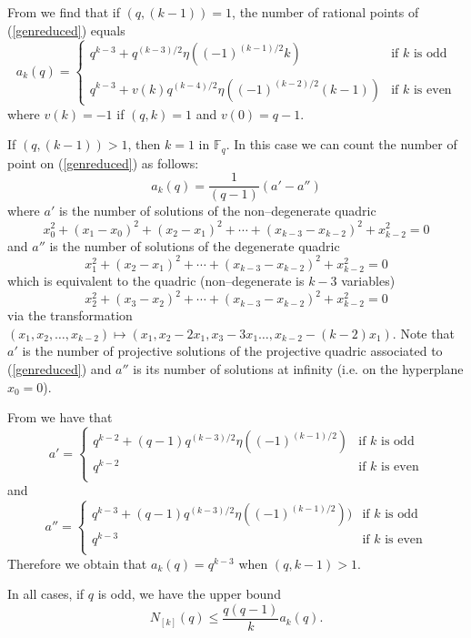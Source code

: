 \documentclass[10pt,a4paper,twoside]{article}
\def\Fq{{\mathbb{F}}_q}
\begin{document}
From
\cite[Theorem 6.26 -- 6.27]{LN}
we find that if $(q,(k-1))=1$, the number of rational points of
(\ref{genreduced}) equals
\begin{equation}\label{akappa}
a_k(q)=
\left\{
\begin{array}{ll}
q^{k-3}+q^{(k-3)/2}\eta((-1)^{(k-1)/2}k) & \textrm{if $k$ is odd}\\
&\\
q^{k-3} +v(k)q^{(k-4)/2}\eta((-1)^{(k-2)/2}(k-1)) & \textrm{if $k$ is even}
\end{array}
\right.
\end{equation}
where $v(k)=-1$ if $(q,k)=1$ and $v(0)=q-1$.

If $(q,(k-1))>1$, then $k=1$ in $\Fq$. In this case we can count the number of
point on (\ref{genreduced}) as follows:
$$a_k(q)=\frac 1{(q-1)}\left(a'-a''\right)$$
where $a'$ is the number of solutions of the non--degenerate
quadric
$$x_0^2+(x_1-x_0)^2+(x_2-x_1)^2+\cdots+(x_{k-3}-x_{k-2})^2+x_{k-2}^2=0$$
and $a''$ is the number of solutions of the degenerate quadric
$$x_1^2+(x_2-x_1)^2+\cdots+(x_{k-3}-x_{k-2})^2+x_{k-2}^2=0$$
which is equivalent to the quadric (non--degenerate is $k-3$ variables)
$$x_2^2+(x_3-x_2)^2+\cdots+(x_{k-3}-x_{k-2})^2+x_{k-2}^2=0$$
via the transformation
$(x_1,x_2,\ldots,x_{k-2})\mapsto \left(x_1,x_2-2x_1,x_3-3x_1
\ldots,x_{k-2}-(k-2)x_1\right)$. Note that $a'$ is the number
of projective solutions of the projective quadric associated to (\ref{genreduced})
and $a''$ is its number of solutions at infinity (i.e. on the hyperplane
$x_0=0$).

From
\cite[Theorem 6.26 -- 6.27]{LN} we have that
$$
a'=\left\{\begin{array}{ll}
q^{k-2}+(q-1)q^{(k-3)/2}\eta((-1)^{(k-1)/2})            & \textrm{if $k$ is odd}\\
q^{k-2}            & \textrm{if $k$ is even}\\
\end{array}
\right.
$$
and$$
a''=\left\{\begin{array}{ll}
q^{k-3}+(q-1)q^{(k-3)/2}\eta((-1)^{(k-1)/2}))            & \textrm{if $k$ is odd}\\
q^{k-3}            & \textrm{if $k$ is even}\\
\end{array}
\right.
$$
Therefore we obtain that $a_k(q)=q^{k-3}$ when $(q,k-1)>1$.%

 In all cases, if $q$ is odd, we have the upper bound
$$N_{[k]}(q)\leq \frac{q(q-1)}{k}a_k(q).$$
\end{document}
